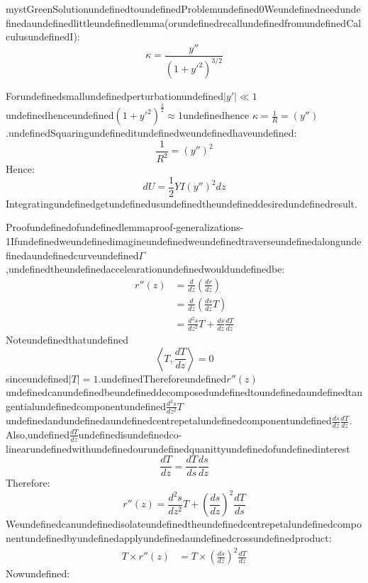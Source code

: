 \begin{mystadmonition}{mystGreen}{SolutionundefinedtoundefinedProblemundefined0}Weundefinedneedundefinedaundefinedlittleundefinedlemma(orundefinedrecallundefinedfromundefinedCalculusundefinedI):
\begin{equation}
\kappa = \frac{y''}{(1+y'^2)^{3/2}}
\end{equation}

Forundefinedsmallundefinedperturbationundefined$|y'|\ll 1$undefinedhenceundefined$(1+y'^2)^{\frac32} \approx 1$undefinedhence
$\kappa = \frac{1}{R}=(y'')$.undefinedSquaringundefineditundefinedweundefinedhaveundefined:
\begin{equation}
\frac{1}{R^2}=(y'')^2
\end{equation}
Hence:
\begin{equation}
dU=\frac12 YI (y'')^2 dz
\end{equation}
Integratingundefinedgetundefinedusundefinedtheundefineddesiredundefinedresult.

\begin{mystthmproof}{Proofundefinedofundefinedlemma}{proof-generalizations-1}Ifundefinedweundefinedimagineundefinedweundefinedtraverseundefinedalongundefinedaundefinedcurveundefined$\Gamma$,undefinedtheundefinedaccelearationundefinedwouldundefinedbe:
\begin{equation}
\begin{aligned}
r''(z) &= \frac{d}{dz}\left(\frac{dr}{dz}\right) \\
&=  \frac{d}{dz}\left(\frac{ds}{dz}T\right)  \\
&= \frac{d^2s}{dz^2}T + \frac{ds}{dz}\frac{dT}{dz}
\end{aligned}
\end{equation}
Noteundefinedthatundefined
\begin{equation}
\left\langle T, \frac{dT}{dz}\right\rangle=0
\end{equation}
sinceundefined$|T|=1$.undefinedThereforeundefined$r''(z)$undefinedcanundefinedbeundefineddecomposedundefinedtoundefinedaundefinedtangentialundefinedcomponentundefined$\frac{d^2s}{dz^2}T$undefinedandundefinedaundefinedcentrepetalundefinedcomponentundefined$\frac{ds}{dz}\frac{dT}{dz}$.
Also,undefined$\frac{dT}{dz}$undefinedisundefinedco-linearundefinedwithundefinedourundefinedquanittyundefinedofundefinedinterest
\begin{equation}
\frac{dT}{dz}=\frac{dT}{ds}\frac{ds}{dz}
\end{equation}
Therefore:
\begin{equation}
\boxed{r''(z)= \frac{d^2s}{dz^2}T + \left(\frac{ds}{dz}\right)^2 \frac{dT}{ds}}
\end{equation}
Weundefinedcanundefinedisolateundefinedtheundefinedcentrepetalundefinedcomponentundefinedbyundefinedapplyundefinedaundefinedcrossundefinedproduct:
\begin{equation}
\begin{aligned}
T\times r''(z) &= T \times \left(\frac{ds}{dz}\right)^2\frac{dT}{dz}
\end{aligned}
\end{equation}
Nowundefined:


\end{mystthmproof}
\end{mystadmonition}
